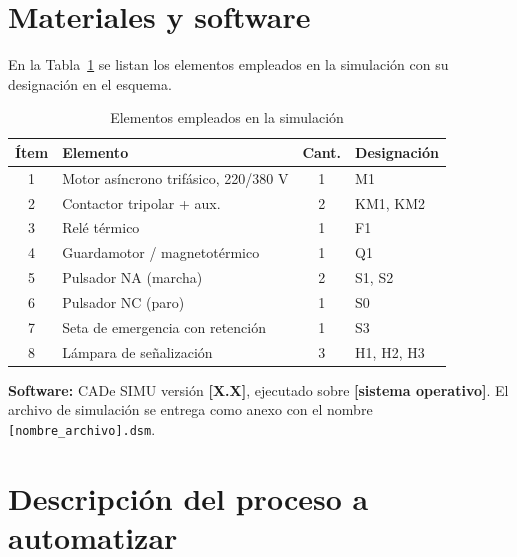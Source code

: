 \documentclass[conference,a4paper,10pt]{IEEEtran}
\begin{document}
\section{Materiales y software}\label{sec:materiales}
En la Tabla~\ref{tab:materiales} se listan los elementos empleados en la
simulación con su designación en el esquema.

\begin{table}[!t]
\renewcommand{\arraystretch}{1.15}
\caption{Elementos empleados en la simulación}
\label{tab:materiales}
\centering
\footnotesize
\begin{tabular}{@{}clcl@{}}
\toprule
\textbf{Ítem} & \textbf{Elemento} & \textbf{Cant.} & \textbf{Designación} \\
\midrule
1 & Motor asíncrono trifásico, 220/380 V & 1 & M1 \\
2 & Contactor tripolar + aux.            & 2 & KM1, KM2 \\
3 & Relé térmico                         & 1 & F1 \\
4 & Guardamotor / magnetotérmico         & 1 & Q1 \\
5 & Pulsador NA (marcha)                 & 2 & S1, S2 \\
6 & Pulsador NC (paro)                   & 1 & S0 \\
7 & Seta de emergencia con retención     & 1 & S3 \\
8 & Lámpara de señalización              & 3 & H1, H2, H3 \\
\bottomrule
\end{tabular}
\end{table}

\textbf{Software:} CADe SIMU versión \textbf{[X.X]}, ejecutado sobre
\textbf{[sistema operativo]}. El archivo de simulación se entrega como anexo
con el nombre \texttt{[nombre\_archivo].dsm}.

\section{Descripción del proceso a automatizar}\label{sec:proceso}
\end{document}
